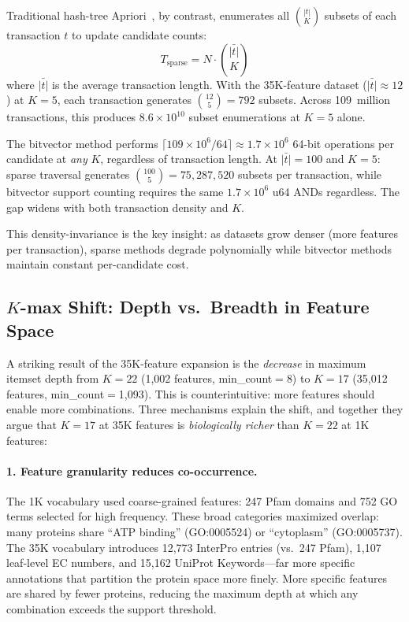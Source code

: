 Traditional hash-tree Apriori~\cite{agrawal1994}, by contrast, enumerates all
$\binom{|t|}{K}$ subsets of each transaction $t$ to update candidate counts:
%
\begin{equation}
    T_{\text{sparse}} = N \cdot \binom{\bar{|t|}}{K}
    \label{eq:sparse-complexity}
\end{equation}
%
where $\bar{|t|}$ is the average transaction length. With the 35K-feature
dataset ($\bar{|t|} \approx 12$) at $K{=}5$, each transaction generates
$\binom{12}{5} = 792$ subsets. Across 109~million transactions, this produces
$8.6 \times 10^{10}$ subset enumerations at $K{=}5$ alone.

The bitvector method performs $\lceil 109{\times}10^6 / 64 \rceil \approx
1.7 \times 10^6$ 64-bit operations per candidate at \emph{any} $K$,
regardless of transaction length. At $\bar{|t|}{=}100$ and $K{=}5$:
sparse traversal generates $\binom{100}{5} = 75{,}287{,}520$ subsets per
transaction, while bitvector support counting requires the same
$1.7 \times 10^6$ u64 ANDs regardless. The gap widens with both transaction
density and $K$.

This density-invariance is the key insight: as datasets grow denser (more
features per transaction), sparse methods degrade polynomially while bitvector
methods maintain constant per-candidate cost.


%

\subsection{$K$-max Shift: Depth vs.\ Breadth in Feature Space}
\label{sec:kmax-shift}

A striking result of the 35K-feature expansion is the \emph{decrease} in
maximum itemset depth from $K{=}22$ (1,002 features, min\_count$=$8) to
$K{=}17$ (35,012 features, min\_count$=$1,093). This is counterintuitive:
more features should enable more combinations. Three mechanisms explain the
shift, and together they argue that $K{=}17$ at 35K features is
\emph{biologically richer} than $K{=}22$ at 1K features:

\paragraph{1. Feature granularity reduces co-occurrence.}
The 1K vocabulary used coarse-grained features: 247 Pfam domains and 752 GO
terms selected for high frequency. These broad categories maximized overlap:
many proteins share ``ATP binding'' (GO:0005524) or ``cytoplasm''
(GO:0005737). The 35K vocabulary introduces 12,773 InterPro entries (vs.\ 247
Pfam), 1,107 leaf-level EC numbers, and 15,162 UniProt Keywords---far more
specific annotations that partition the protein space more finely. More
specific features are shared by fewer proteins, reducing the maximum depth
at which any combination exceeds the support threshold.

